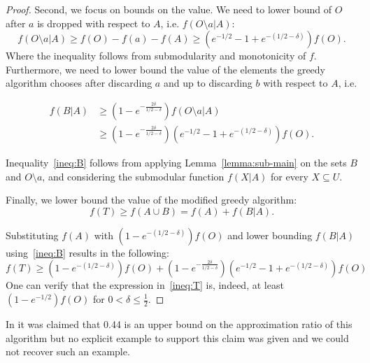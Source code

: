 \begin{proof}
	Second, we focus on bounds on the value.
	We need to lower bound of $O$ after $a$ is dropped with respect to $A$, i.e. $f(O \setminus a | A)$:
	\begin{equation}
		f(O \setminus a | A) \geq f(O) - f(a) - f(A) \geq (e^{-1/2} - 1 + e^{-(1/2 - \delta)})f(O).
	\end{equation}
	Where the inequality follows from submodularity and monotonicity of $f$.
	Furthermore, we need to lower bound the value of the elements the greedy algorithm chooses after discarding $a$ and up to discarding $b$ with respect to $A$, i.e. 
	
	\begin{align}
		\label{ineq:B}
		f(B|A)	& \geq (1 - e^{-\frac{2\delta}{1/2 - \delta}})f(O \setminus a | A)
		\\ 		& \geq (1 - e^{-\frac{2\delta}{1/2 - \delta}})(e^{-1/2} - 1 + e^{-(1/2 - \delta)})f(O).
		\nonumber
	\end{align}
	
	Inequality~\ref{ineq:B} follows from applying Lemma~\ref{lemma:sub-main} on the sets $B$ and $O \setminus a$, and considering the submodular function $f(X|A)$ for every $X \subseteq U$.
	
	Finally, we lower bound the value of the modified greedy algorithm:
	\begin{equation}
		f(T) \geq f(A \cup B) = f(A) + f(B | A).
	\end{equation}
	
	Substituting $f(A)$ with $(1 - e^{-(1/2 - \delta)})f(O)$ and lower bounding $f(B|A)$ using~\ref{ineq:B} results in the following:
	\begin{equation}
		\label{ineq:T}
		f(T) \geq (1 - e^{-(1/2 - \delta)})f(O) + (1 - e^{-\frac{2\delta}{1/2 - \delta}})(e^{-1/2} - 1 + e^{-(1/2 - \delta)})f(O)
	\end{equation}
	One can verify that the expression in~\ref{ineq:T} is, indeed, at least $(1-e^{-1/2})f(O)$ for $0 < \delta \leq \frac{1}{2}$.
\end{proof}

In \cite{khuller1999budgeted} it was claimed that 0.44 is an upper bound on the approximation ratio of this algorithm but no explicit example to support this claim was given and we could not recover such an example.

